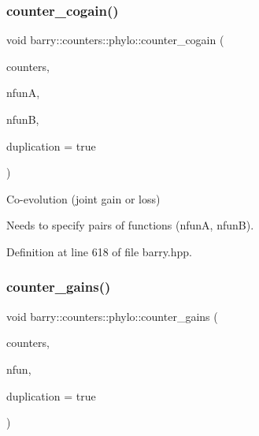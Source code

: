 \subsubsection{\texorpdfstring{counter\+\_\+cogain()}{counter\_cogain()}}
{\footnotesize\ttfamily void barry\+::counters\+::phylo\+::counter\+\_\+cogain (\begin{DoxyParamCaption}\item[{\hyperlink{namespacebarry_1_1counters_1_1phylo_a4e401ffe66d04091343dcffaf915f8c3}{Phylo\+Counters} $\ast$}]{counters,  }\item[{\hyperlink{namespacebarry_a11dfc53ddb4672278319aa04f1e09a6c}{uint}}]{nfunA,  }\item[{\hyperlink{namespacebarry_a11dfc53ddb4672278319aa04f1e09a6c}{uint}}]{nfunB,  }\item[{bool}]{duplication = {\ttfamily true} }\end{DoxyParamCaption})\hspace{0.3cm}{\ttfamily [inline]}}



Co-\/evolution (joint gain or loss) 

Needs to specify pairs of functions ({\ttfamily nfunA}, {\ttfamily nfunB}). 

Definition at line 618 of file barry.\+hpp.

\mbox{\label{namespacebarry_1_1counters_1_1phylo_afc1215e596c2f5a5e3b6f39273427a9a}} 
\subsubsection{\texorpdfstring{counter\+\_\+gains()}{counter\_gains()}}
{\footnotesize\ttfamily void barry\+::counters\+::phylo\+::counter\+\_\+gains (\begin{DoxyParamCaption}\item[{\hyperlink{namespacebarry_1_1counters_1_1phylo_a4e401ffe66d04091343dcffaf915f8c3}{Phylo\+Counters} $\ast$}]{counters,  }\item[{std\+::vector$<$ \hyperlink{namespacebarry_a11dfc53ddb4672278319aa04f1e09a6c}{uint} $>$}]{nfun,  }\item[{bool}]{duplication = {\ttfamily true} }\end{DoxyParamCaption})\hspace{0.3cm}{\ttfamily [inline]}}



